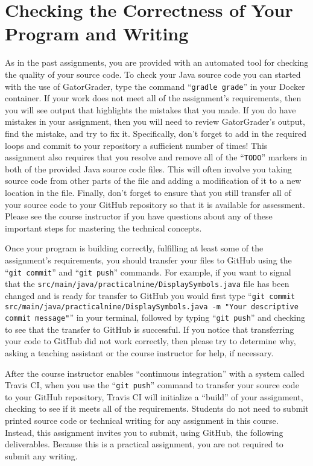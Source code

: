 \documentclass[11pt]{article}
\newcommand{\mainprogramsource}{\lstinline{src/main/java/practicalnine/DisplaySymbols.java}}
\newcommand{\gatorgraderstart}{\command{gradle grade}}
\newcommand{\gitcommit}{\command{git commit}}
\newcommand{\gitpush}{\command{git push}}
\newcommand{\gitcommitmainprogram}{\command{git commit src/main/java/practicalnine/DisplaySymbols.java -m "Your
descriptive commit message"}}
\newcommand{\command}[1]{``\lstinline{#1}''}
\newcommand{\step}[1]{``{#1}''}
\begin{document}
\section*{Checking the Correctness of Your Program and Writing}

As in the past assignments, you are provided with an automated tool for checking
the quality of your source code. To check your Java source code you can started
with the use of GatorGrader, type the command \gatorgraderstart{} in your
Docker container. If your work does not meet all of the assignment's
requirements, then you will see output that highlights the mistakes that you
made. If you do have mistakes in your assignment, then you will need to review
GatorGrader's output, find the mistake, and try to fix it. Specifically, don't
forget to add in the required loops and commit to your repository a sufficient
number of times! This assignment also requires that you resolve and remove all
of the \command{TODO} markers in both of the provided Java source code files.
This will often involve you taking source code from other parts of the file and
adding a modification of it to a new location in the file. Finally, don't forget
to ensure that you still transfer all of your source code to your GitHub
repository so that it is available for assessment. Please see the course
instructor if you have questions about any of these important steps for
mastering the technical concepts.

Once your program is building correctly, fulfilling at least some of the
assignment's requirements, you should transfer your files to GitHub using the
\gitcommit{} and \gitpush{} commands. For example, if you want to signal that
the \mainprogramsource{} file has been changed and is ready for transfer to
GitHub you would first type \gitcommitmainprogram{} in your terminal, followed
by typing \gitpush{} and checking to see that the transfer to GitHub is
successful. If you notice that transferring your code to GitHub did not work
correctly, then please try to determine why, asking a teaching assistant or the
course instructor for help, if necessary.

After the course instructor enables \step{continuous integration} with a system
called Travis CI, when you use the \gitpush{} command to transfer your source
code to your GitHub repository, Travis CI will initialize a \step{build} of your
assignment, checking to see if it meets all of the requirements. Students do not
need to submit printed source code or technical writing for any assignment in
this course. Instead, this assignment invites you to submit, using GitHub, the
following deliverables. Because this is a practical assignment, you are not
required to submit any writing.
\end{document}
